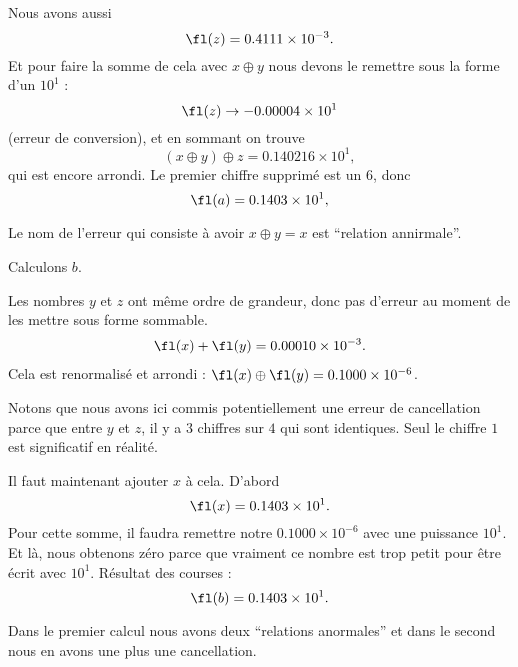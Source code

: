\begin{example}
	Nous avons aussi
	\begin{equation}
		\fl(z)=0.4111\times 10^{-3}.
	\end{equation}
	Et pour faire la somme de cela avec \( x\oplus y\) nous devons le remettre sous la forme d'un \( 10^1\) :
	\begin{equation}
		\fl(z)\to -0.00004\times 10^1
	\end{equation}
	(erreur de conversion), et en sommant on trouve
	\begin{equation}
		(x\oplus y)\oplus z=0.140216\times 10^1,
	\end{equation}
	qui est encore arrondi. Le premier chiffre supprimé est un \( 6\), donc
	\begin{equation}
		\fl(a)=0.1403\times 10^1,
	\end{equation}

	Le nom de l'erreur qui consiste à avoir \( x\oplus y=x\) est ``relation annirmale''.

	Calculons \( b\).

	Les nombres \( y\) et \( z\) ont même ordre de grandeur, donc pas d'erreur au moment de les mettre sous forme sommable.
	\begin{subequations}
		\begin{align}
			\fl(x)+\fl(y)=0.00010\times 10^{-3}.
		\end{align}
	\end{subequations}
	Cela est renormalisé et arrondi : \( \fl(x)\oplus\fl(y)=0.1000\times 10^{-6}\).

	Notons que nous avons ici commis potentiellement une erreur de cancellation parce que entre \( y\) et \( z\), il y a \( 3\) chiffres sur \( 4\) qui sont identiques. Seul le chiffre \( 1\) est significatif en réalité.

	Il faut maintenant ajouter \( x\) à cela. D'abord
	\begin{equation}
		\fl(x)=0.1403\times 10^1.
	\end{equation}
	Pour cette somme, il faudra remettre notre \( 0.1000\times 10^{-6}\) avec une puissance \( 10^1\). Et là, nous obtenons zéro parce que vraiment ce nombre est trop petit pour être écrit avec \( 10^1\). Résultat des courses :
	\begin{equation}
		\fl(b)=0.1403\times 10^1.
	\end{equation}


	Dans le premier calcul nous avons deux ``relations anormales'' et dans le second nous en avons une plus une cancellation.


\end{example}
